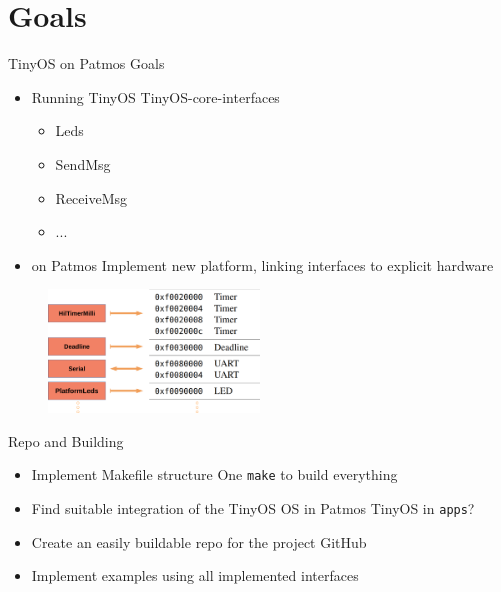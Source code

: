 \section{Goals}
    
    \begin{frame}{TinyOS on Patmos Goals}
        \begin{itemize}
            \item Running TinyOS\newline
            TinyOS-core-interfaces
            \begin{itemize}
                \item Leds
                \item SendMsg
                \item ReceiveMsg
                \item ...
            \end{itemize}
            
            \item on Patmos\newline
            Implement new platform, linking interfaces to explicit hardware
            
        \end{itemize}
        \begin{figure}[h]
              \centering
              \includegraphics[width=0.5\textwidth]{images/aca.png}
            \end{figure}
        
    \end{frame}
    
    \begin{frame}{Repo and Building}
        \begin{itemize}
            \item Implement Makefile structure\newline
            One \texttt{make} to build everything
            \item Find suitable integration of the TinyOS OS in Patmos\newline
            TinyOS in \texttt{apps}?
            \item Create an easily buildable repo for the project\newline
            \xrightarrow{}GitHub
            
        \end{itemize}
        \begin{itemize}
            \item Implement examples using all implemented interfaces
        \end{itemize}
        
    \end{frame}